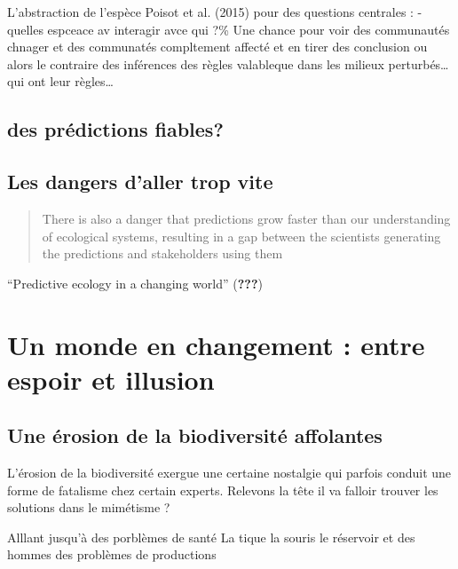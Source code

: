 L'abstraction de l'espèce Poisot et al. (2015) pour des questions
centrales : - quelles espceace av interagir avce qui ?\% Une chance pour
voir des communautés chnager et des communatés compltement affecté et en
tirer des conclusion ou alors le contraire des inférences des règles
valableque dans les milieux perturbés\ldots{} qui ont leur
règles\ldots{}

\subsection*{des prédictions fiables?}\label{des-pruxe9dictions-fiables}

\subsection*{Les dangers d'aller trop
vite}\label{les-dangers-daller-trop-vite}

\begin{quote}
There is also a danger that predictions grow faster than our
understanding of ecological systems, resulting in a gap between the
scientists generating the predictions and stakeholders using them
\end{quote}

``Predictive ecology in a changing world'' ({\textbf{???}})

\section*{Un monde en changement : entre espoir et
illusion}\label{un-monde-en-changement-entre-espoir-et-illusion}

\subsection*{Une érosion de la biodiversité
affolantes}\label{une-uxe9rosion-de-la-biodiversituxe9-affolantes}

L'érosion de la biodiversité exergue une certaine nostalgie qui parfois
conduit une forme de fatalisme chez certain experts. Relevons la tête il
va falloir trouver les solutions dans le mimétisme ?

Alllant jusqu'à des porblèmes de santé La tique la souris le réservoir
et des hommes des problèmes de productions

